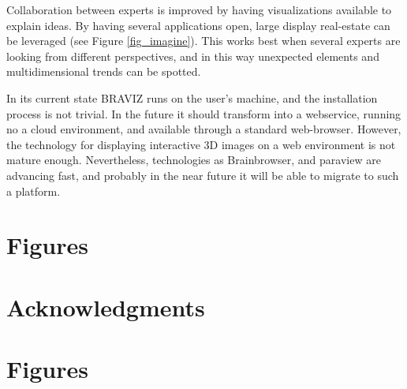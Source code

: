 \documentclass[utf8]{frontiersSCNS} %
\begin{document}
Collaboration between experts is improved by having visualizations available to explain ideas. By having several applications open, large display real-estate can be leveraged (see Figure \ref{fig_imagine}). This works best when several experts are looking from different perspectives, and in this way unexpected elements and multidimensional trends can be spotted.


In its current state BRAVIZ runs on the user's machine, and the installation process is not trivial. In the future it should transform into a webservice, running no a cloud environment, and available through a standard web-browser. However, the technology for displaying interactive 3D images on a web environment is not mature enough. Nevertheless, technologies as Brainbrowser\citep{sherif_brainbrowser:_2014}, and paraview\citep{ahrens_36_2005} are advancing fast, and probably in the near future it will be able to migrate to such a platform. 


\section{Figures}

\section*{Acknowledgments}





\section*{Figures}
\end{document}
